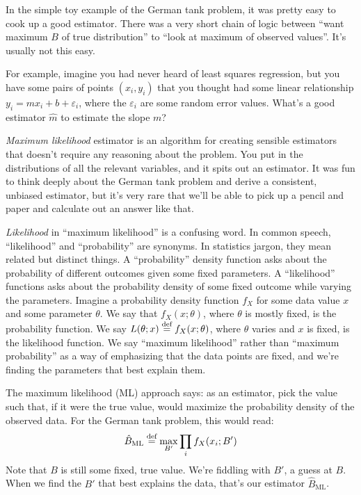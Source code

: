 In the simple toy example of the German tank problem, it was pretty easy to
cook up a good estimator. There was a very short chain of logic between ``want
maximum $B$ of true distribution'' to ``look at maximum of observed values''.
It's usually not this easy.

For example, imagine you had never heard of least squares regression, but you
have some pairs of points $(x_i, y_i)$ that you thought had some linear
relationship $y_i = m x_i + b + \varepsilon_i$, where the $\varepsilon_i$ are
some random error values. What's a good estimator $\hat{m}$ to estimate the
slope $m$?

\emph{Maximum likelihood} estimator is an algorithm for creating sensible
estimators that doesn't require any reasoning about the problem. You put in
the distributions of all the relevant variables, and it spits out an
estimator. It was fun to think deeply about the German tank problem and
derive a consistent, unbiased estimator, but it's very rare that we'll be
able to pick up a pencil and paper and calculate out an answer like that.

\emph{Likelihood} in ``maximum likelihood'' is a confusing word. In common
speech, ``likelihood'' and ``probability'' are synonyms. In statistics jargon,
they mean related but distinct things. A ``probability'' density function asks
about the probability of different outcomes given some fixed parameters. A
``likelihood'' functions asks about the probability density of some fixed
outcome while varying the parameters. Imagine a probability density function
$f_X$ for some data value $x$ and some parameter $\theta$. We say that $f_X(x;
\theta)$, where $\theta$ is mostly fixed, is the probability function. We say
$L(\theta; x) \stackrel{\text{def}}{=} f_X(x; \theta)$, where $\theta$ varies and $x$ is fixed,
is the likelihood function. We say ``maximum likelihood'' rather than
``maximum probability'' as a way of emphasizing that the data points are
fixed, and we're finding the parameters that best explain them.

The maximum likelihood (ML) approach says: as an estimator, pick the value
such that, if it were the true value, would maximize the probability density
of the observed data. For the German tank problem, this would read:
\begin{equation}
\hat{B}_\text{ML} \stackrel{\text{def}}{=} \max_{B'} \prod_i f_X(x_i; B')
\end{equation}
Note that $B$ is still some fixed, true value. We're fiddling with $B'$, a
guess at $B$. When we find the $B'$ that best explains the data, that's our
estimator $\hat{B}_\mathrm{ML}$.

